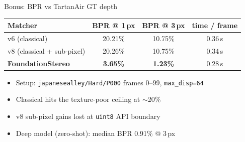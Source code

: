 \documentclass[aspectratio=169,11pt]{beamer}
\newcommand{\code}[1]{\texttt{#1}}
\newcommand{\green}[1]{\textcolor{goodGreen}{#1}}
\begin{document}
\begin{frame}{Bonus: BPR vs TartanAir GT depth}
\begin{table}
\centering
\large
\begin{tabular}{lccc}
\toprule
Matcher & BPR @ 1\,px & BPR @ 3\,px & time / frame \\
\midrule
v6 (classical)               & 20.21\% & 10.75\% & 0.36\,s \\
v8 (classical + sub-pixel)   & 20.26\% & 10.75\% & 0.34\,s \\
\textbf{FoundationStereo}    & \green{\textbf{3.65\%}}  & \green{\textbf{1.23\%}}  & 0.28\,s \\
\bottomrule
\end{tabular}
\end{table}

\vspace{0.4em}
\begin{itemize}
    \item Setup: \code{japanesealley/Hard/P000} frames 0--99, \code{max\_disp=64}
    \item Classical hits the texture-poor ceiling at $\sim$20\%
    \item v8 sub-pixel gains lost at \code{uint8} API boundary
    \item Deep model (zero-shot): median BPR \green{0.91\%} @ 3\,px
\end{itemize}
\end{frame}
\end{document}
